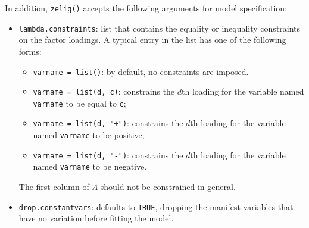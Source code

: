 In addition, {\tt zelig()} accepts the following arguments for model
specification:  
\begin{itemize}
\item \texttt{lambda.constraints}: list that contains the equality or 
inequality constraints on the factor loadings. A typical entry in the list
has one of the following forms: 
\begin{itemize}
\item {\tt varname = list()}: by default, no constraints are imposed.
\item \texttt{varname = list(d, c)}: constrains the
$d$th loading for the variable named \texttt{varname} to be equal to \texttt{c};
\item \texttt{varname = list(d, "+")}: constrains the
$d$th loading for the variable named \texttt{varname} to be positive;
\item \texttt{varname = list(d, "-")}: constrains the
$d$th loading for the variable named \texttt{varname} to be negative. 
\end{itemize}
The first column of $\Lambda$ should not be constrained in general.

\item \texttt{drop.constantvars}: defaults to {\tt TRUE}, dropping the
manifest variables that have no variation before fitting the model. 

\end{itemize}

